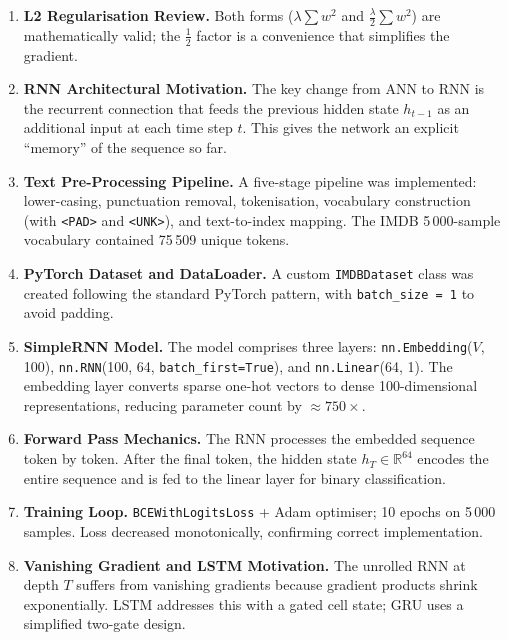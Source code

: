 \documentclass[12pt,a4paper]{article}
\begin{document}
\begin{enumerate}[label=\textbf{\arabic*.}]
  \item \textbf{L2 Regularisation Review.}  Both forms
        ($\lambda \sum w^2$ and $\tfrac{\lambda}{2} \sum w^2$) are
        mathematically valid; the $\tfrac{1}{2}$ factor is a
        convenience that simplifies the gradient.

  \item \textbf{RNN Architectural Motivation.}  The key change from
        ANN to RNN is the recurrent connection that feeds the previous
        hidden state $h_{t-1}$ as an additional input at each time
        step $t$.  This gives the network an explicit ``memory'' of the
        sequence so far.

  \item \textbf{Text Pre-Processing Pipeline.}  A five-stage pipeline
        was implemented: lower-casing, punctuation removal,
        tokenisation, vocabulary construction (with \texttt{<PAD>} and
        \texttt{<UNK>}), and text-to-index mapping.  The IMDB
        5\,000-sample vocabulary contained 75\,509 unique tokens.

  \item \textbf{PyTorch Dataset and DataLoader.}  A custom
        \texttt{IMDBDataset} class was created following the standard
        PyTorch pattern, with \texttt{batch\_size = 1} to avoid padding.

  \item \textbf{SimpleRNN Model.}  The model comprises three layers:
        \texttt{nn.Embedding}($V$, 100),
        \texttt{nn.RNN}(100, 64, \texttt{batch\_first=True}), and
        \texttt{nn.Linear}(64, 1).  The embedding layer converts sparse
        one-hot vectors to dense 100-dimensional representations,
        reducing parameter count by $\approx 750\times$.

  \item \textbf{Forward Pass Mechanics.}  The RNN processes the embedded
        sequence token by token.  After the final token, the hidden
        state $h_T \in \mathbb{R}^{64}$ encodes the entire sequence
        and is fed to the linear layer for binary classification.

  \item \textbf{Training Loop.}  \texttt{BCEWithLogitsLoss} +
        Adam optimiser; 10 epochs on 5\,000 samples.  Loss decreased
        monotonically, confirming correct implementation.

  \item \textbf{Vanishing Gradient and LSTM Motivation.}  The unrolled
        RNN at depth $T$ suffers from vanishing gradients because
        gradient products shrink exponentially.  LSTM addresses this
        with a gated cell state; GRU uses a simplified two-gate design.
\end{enumerate}
\end{document}
